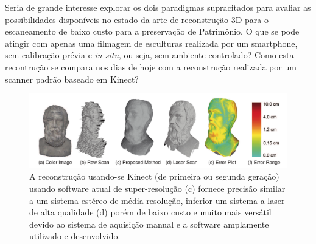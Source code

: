 Seria de grande interesse explorar os dois paradigmas supracitados
para avaliar as possibilidades disponíveis no estado da arte de reconstrução 3D
para o escaneamento de baixo custo para a preservação de Patrimônio. O que se
pode atingir com apenas uma filmagem de esculturas realizada por um smartphone,
sem calibração prévia e \emph{in situ}, ou seja, sem ambiente controlado?  Como
esta recontrução se compara nos dias de hoje com a reconstrução realizada por um
scanner padrão baseado em Kinect?

\begin{figure}[!h]
	\centering
	\includegraphics[width=1\linewidth]{figs/kinect-vs-usual.png}
	\caption{%
    A reconstrução usando-se Kinect (de primeira ou segunda geração) usando
    software atual de super-resolução (c) fornece precisão similar a um sistema estéreo de média
    resolução, inferior um sistema a laser de alta qualidade (d) porém de baixo custo e
    muito mais versátil devido ao sistema de aquisição manual e a software
    amplamente utilizado e
    desenvolvido\cite{wang2015research}.
	}\label{fig:rec3d:comparacao}
\end{figure}

